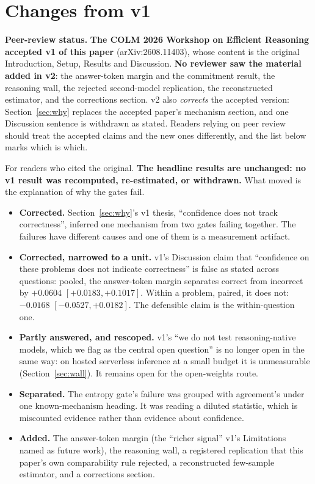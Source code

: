 \documentclass{article}
\begin{document}
\section*{Changes from v1}

\textbf{Peer-review status.} \textbf{The COLM 2026 Workshop on Efficient
Reasoning accepted v1 of this paper} (arXiv:2608.11403), whose content is
the original Introduction, Setup, Results and
Discussion. \textbf{No reviewer saw the material added in v2}: the
answer-token margin and the commitment result, the reasoning wall, the
rejected second-model replication, the reconstructed estimator, and the
corrections section. v2 also \emph{corrects} the accepted version:
Section~\ref{sec:why} replaces the accepted paper's mechanism section, and one
Discussion sentence is withdrawn as stated. Readers relying on peer review
should treat the accepted claims and the new ones differently, and the list
below marks which is which.

For readers who cited the original. \textbf{The headline results are
unchanged: no v1 result was recomputed, re-estimated, or withdrawn.} What
moved is the explanation of why the gates fail.

\begin{itemize}
\item \textbf{Corrected.} Section~\ref{sec:why}'s v1 thesis, ``confidence does
not track correctness'', inferred one mechanism from two gates failing
together. The failures have different causes and one of them is a measurement
artifact.
\item \textbf{Corrected, narrowed to a unit.} v1's Discussion claim that
``confidence on these problems does not indicate correctness'' is false as
stated across questions: pooled, the answer-token margin separates correct
from incorrect by $+0.0604$ $[+0.0183, +0.1017]$. Within a problem, paired, it
does not: $-0.0168$ $[-0.0527, +0.0182]$. The defensible claim is the
within-question one.
\item \textbf{Partly answered, and rescoped.} v1's ``we do not test
reasoning-native models, which we flag as the central open question'' is no
longer open in the same way: on hosted serverless inference at a small budget
it is unmeasurable (Section~\ref{sec:wall}). It remains open for the
open-weights route.
\item \textbf{Separated.} The entropy gate's failure was grouped with
agreement's under one known-mechanism heading. It was reading a diluted
statistic, which is miscounted evidence rather than evidence about confidence.
\item \textbf{Added.} The answer-token margin (the ``richer signal'' v1's
Limitations named as future work), the reasoning wall, a registered
replication that this paper's own comparability rule rejected, a reconstructed
few-sample estimator, and a corrections section.
\end{itemize}
\end{document}
